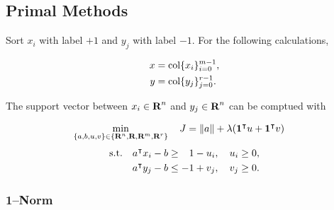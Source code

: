 \documentclass{article}
\begin{document}
\clearpage

\subsection{Primal Methods}

    Sort $x_i$ with label $+1$ 
    and $y_j$ with label $-1$.
    For the following calculations,

    \begin{align*}
        x &= \text{col}\{x_i\}_{i=0}^{m-1},
        \\
        y &= \text{col}\{y_j\}_{j=0}^{r-1}.
    \end{align*}

    The support vector between $x_i\in\textbf{R}^n$ and $y_j\in\textbf{R}^n$
    can be comptued with \cite[p.~427]{bv_cvxbook}
    
    \begin{align*}
        \min_{\{a,b,u,v\}\in\{\textbf{R}^n,\textbf{R},\textbf{R}^m,\textbf{R}^r\}} \quad 
        J & = \|a\|+\lambda (\textbf{1}^\intercal u + \textbf{1}^\intercal v)
    \end{align*}
    \begin{align*}
        \st\quad a^\tp x_i - b &\geq \minus 1-u_i,\quad u_i\geq 0,\\
                    a^\tp y_j - b &\leq -1+v_j,\quad v_j\geq 0.
    \end{align*}    

\subsubsection{1--Norm}
\end{document}

